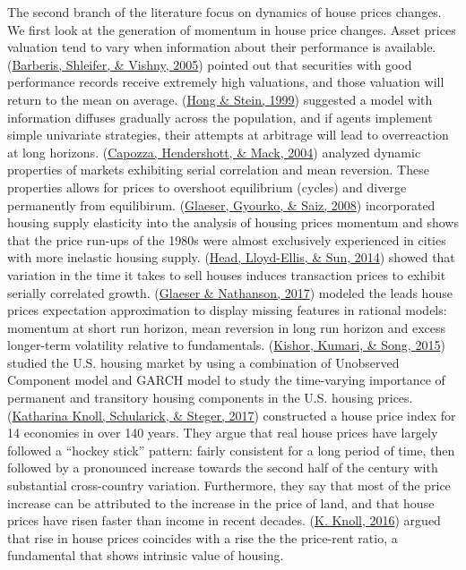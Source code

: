 \documentclass[
  12pt,
]{article}
\begin{document}
The second branch of the literature focus on dynamics of house prices changes. We first look at the generation of momentum in house price changes. Asset prices valuation tend to vary when information about their performance is available. (\protect\hyperlink{ref-thaler_chapter_2005}{Barberis, Shleifer, \& Vishny, 2005}) pointed out that securities with good performance records receive extremely high valuations, and those valuation will return to the mean on average. (\protect\hyperlink{ref-hong_unified_1999}{Hong \& Stein, 1999}) suggested a model with information diffuses gradually across the population, and if agents implement simple univariate strategies, their attempts at arbitrage will lead to overreaction at long horizons. (\protect\hyperlink{ref-capozza_anatomy_2004}{Capozza, Hendershott, \& Mack, 2004}) analyzed dynamic properties of markets exhibiting serial correlation and mean reversion. These properties allows for prices to overshoot equilibrium (cycles) and diverge permanently from equilibirum. (\protect\hyperlink{ref-glaeser_housing_2008}{Glaeser, Gyourko, \& Saiz, 2008}) incorporated housing supply elasticity into the analysis of housing prices momentum and shows that the price run-ups of the 1980s were almost exclusively experienced in cities with more inelastic housing supply. (\protect\hyperlink{ref-head_search_2014}{Head, Lloyd-Ellis, \& Sun, 2014}) showed that variation in the time it takes to sell houses induces transaction prices to exhibit serially correlated growth. (\protect\hyperlink{ref-glaeser_extrapolative_2017}{Glaeser \& Nathanson, 2017}) modeled the leads house prices expectation approximation to display missing features in rational models: momentum at short run horizon, mean reversion in long run horizon and excess longer-term volatility relative to fundamentals. (\protect\hyperlink{ref-kishor_time_2015}{Kishor, Kumari, \& Song, 2015}) studied the U.S. housing market by using a combination of Unobserved Component model and GARCH model to study the time-varying importance of permanent and transitory housing components in the U.S. housing prices. (\protect\hyperlink{ref-knoll_no_2017}{Katharina Knoll, Schularick, \& Steger, 2017}) constructed a house price index for 14 economies in over 140 years. They argue that real house prices have largely followed a ``hockey stick'' pattern: fairly consistent for a long period of time, then followed by a pronounced increase towards the second half of the century with substantial cross-country variation. Furthermore, they say that most of the price increase can be attributed to the increase in the price of land, and that house prices have risen faster than income in recent decades. (\protect\hyperlink{ref-knoll_return_2016}{K. Knoll, 2016}) argued that rise in house prices coincides with a rise the the price-rent ratio, a fundamental that shows intrinsic value of housing.
\end{document}
